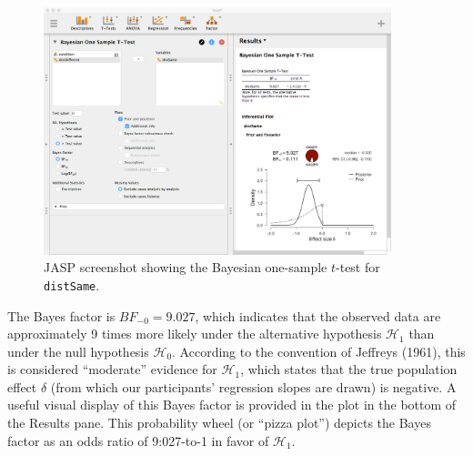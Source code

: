 \documentclass[english,,doc,floatsintext]{apa6}
\begin{document}
\begin{figure}
\centering
\includegraphics[width=0.9\textwidth,height=\textheight]{figures/ttestBayes.png}
\caption{\label{fig:ttestBayes}JASP screenshot showing the Bayesian one-sample \(t\)-test for \texttt{distSame}.}
\end{figure}

The Bayes factor is \(BF_{-0}=9.027\), which indicates that the observed data are approximately 9 times more likely under the alternative hypothesis \(\mathcal{H}_{1}\) than under the null hypothesis \(\mathcal{H}_{0}\). According to the convention of Jeffreys (1961), this is considered \enquote{moderate} evidence for \(\mathcal{H}_{1}\), which states that the true population effect \(\delta\) (from which our participants' regression slopes are drawn) is negative. A useful visual display of this Bayes factor is provided in the plot in the bottom of the Results pane. This probability wheel (or \enquote{pizza plot}) depicts the Bayes factor as an odds ratio of 9:027-to-1 in favor of \(\mathcal{H}_{1}\).
\end{document}
